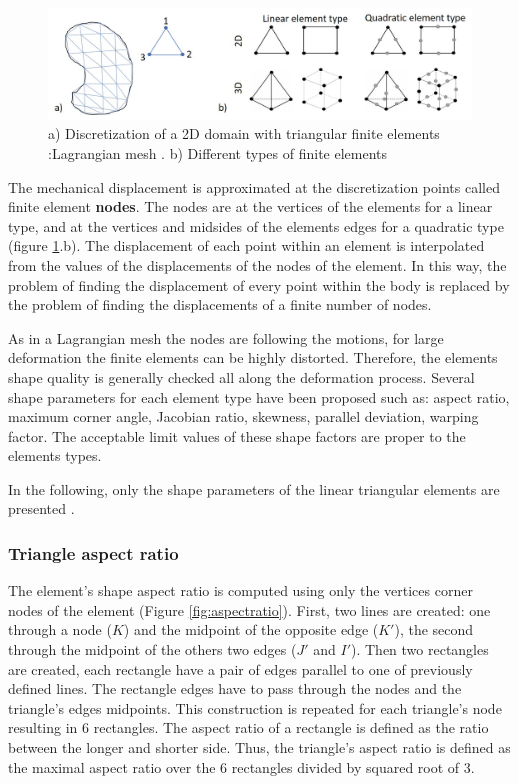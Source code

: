 \begin{figure}[!h]
\centering
\includegraphics[width=1\textwidth,keepaspectratio]{figures/discretization.jpg} 
\caption{a) Discretization of  a 2D domain with triangular finite elements :Lagrangian mesh . b) Different types of finite elements}
\label{discretization}
\end{figure}

 The mechanical displacement is approximated at the discretization points called finite element \textbf{nodes}. The nodes are at the vertices of the elements for a linear type, and at the vertices and midsides of the elements edges for a quadratic type (figure \ref{discretization}.b). The displacement of each point within an element is interpolated from the values of the displacements of the nodes of the element. In this way, the problem of finding the displacement of every point within the body is replaced by the problem of finding the displacements of a finite number of nodes.
 
 As in a Lagrangian mesh the nodes are following the motions, for large deformation the finite elements can be highly distorted. Therefore, the elements shape quality is generally checked all along the deformation process. Several shape parameters for each element type have been proposed such as: aspect ratio, maximum corner angle, Jacobian ratio, skewness, parallel deviation, warping factor. The acceptable limit values of these shape factors are proper to the elements types. 
 
In the following, only the shape parameters of the linear triangular elements are presented \citep{ansys_theory_2017}.  
 \subsubsection*{Triangle aspect ratio }
 The element's shape aspect ratio is computed using only the vertices corner nodes of the element (Figure \ref{fig:aspectratio}). First, two lines are created: one through a node ($K$) and the midpoint of the opposite edge ($ K'$), the second through the midpoint of the others two edges ($J'$ and $ I'$). Then two rectangles are created, each rectangle have a pair of edges parallel to one of previously defined lines. The rectangle edges have to pass through the nodes and the triangle's edges midpoints. This construction is repeated for each triangle's node resulting in 6 rectangles. The aspect ratio of a rectangle is defined as the ratio between the longer and shorter side. Thus, the triangle's aspect ratio is defined as the maximal aspect ratio over the 6 rectangles divided by squared root of 3. 
 
